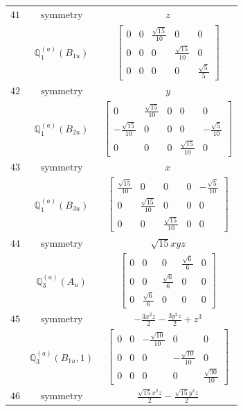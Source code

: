 \documentclass[fleqn,8pt,landscape]{jsarticle}
\begin{document}
\begin{longtable}{ccc}
$ 41 $ & $ \text{symmetry} $ & $ z $ \\
$  $ & $ \mathbb{Q}_{1}^{(a)}(B_{1u}) $ & $ \begin{bmatrix} 0 & 0 & \frac{\sqrt{15}}{10} & 0 & 0 \\ 0 & 0 & 0 & \frac{\sqrt{15}}{10} & 0 \\ 0 & 0 & 0 & 0 & \frac{\sqrt{5}}{5} \end{bmatrix} $ \\ \hline
$ 42 $ & $ \text{symmetry} $ & $ y $ \\
$  $ & $ \mathbb{Q}_{1}^{(a)}(B_{2u}) $ & $ \begin{bmatrix} 0 & \frac{\sqrt{15}}{10} & 0 & 0 & 0 \\ - \frac{\sqrt{15}}{10} & 0 & 0 & 0 & - \frac{\sqrt{5}}{10} \\ 0 & 0 & 0 & \frac{\sqrt{15}}{10} & 0 \end{bmatrix} $ \\ \hline
$ 43 $ & $ \text{symmetry} $ & $ x $ \\
$  $ & $ \mathbb{Q}_{1}^{(a)}(B_{3u}) $ & $ \begin{bmatrix} \frac{\sqrt{15}}{10} & 0 & 0 & 0 & - \frac{\sqrt{5}}{10} \\ 0 & \frac{\sqrt{15}}{10} & 0 & 0 & 0 \\ 0 & 0 & \frac{\sqrt{15}}{10} & 0 & 0 \end{bmatrix} $ \\ \hline
$ 44 $ & $ \text{symmetry} $ & $ \sqrt{15} x y z $ \\
$  $ & $ \mathbb{Q}_{3}^{(a)}(A_{u}) $ & $ \begin{bmatrix} 0 & 0 & 0 & \frac{\sqrt{6}}{6} & 0 \\ 0 & 0 & \frac{\sqrt{6}}{6} & 0 & 0 \\ 0 & \frac{\sqrt{6}}{6} & 0 & 0 & 0 \end{bmatrix} $ \\ \hline
$ 45 $ & $ \text{symmetry} $ & $ - \frac{3 x^{2} z}{2} - \frac{3 y^{2} z}{2} + z^{3} $ \\
$  $ & $ \mathbb{Q}_{3}^{(a)}(B_{1u},1) $ & $ \begin{bmatrix} 0 & 0 & - \frac{\sqrt{10}}{10} & 0 & 0 \\ 0 & 0 & 0 & - \frac{\sqrt{10}}{10} & 0 \\ 0 & 0 & 0 & 0 & \frac{\sqrt{30}}{10} \end{bmatrix} $ \\ \hline
$ 46 $ & $ \text{symmetry} $ & $ \frac{\sqrt{15} x^{2} z}{2} - \frac{\sqrt{15} y^{2} z}{2} $ \\

\end{longtable}
\end{document}
